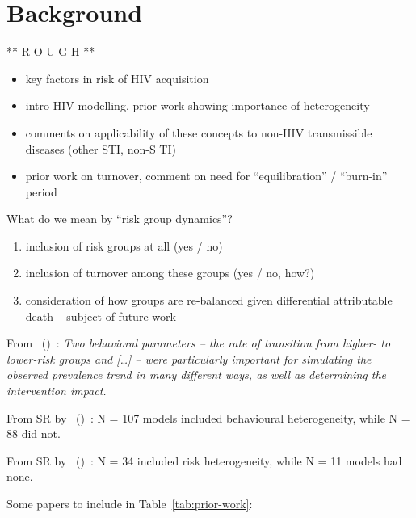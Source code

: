 \documentclass[10pt]{article}
\numberwithin{equation}{section}
\newcommand{\citet}[1]{\citeauthor{#1}~(\citeyear{#1})~\cite{#1}}
\begin{document}
\section{Background}\label{s:background}
** R O U G H **
\begin{itemize}
  \item key factors in risk of HIV acquisition
  \item intro HIV modelling, prior work showing importance of heterogeneity
  \item comments on applicability of these concepts to non-HIV transmissible diseases
        (other STI, non-S TI)
  \item prior work on turnover, comment on need for ``equilibration'' / ``burn-in'' period
\end{itemize}
What do we mean by ``risk group dynamics''?
\begin{enumerate}
  \item inclusion of risk groups at all (yes / no)
  \item inclusion of turnover among these groups (yes / no, how?)
  \item consideration of how groups are re-balanced given differential attributable death
  -- subject of future work
\end{enumerate}
\par
From \citet{Eaton2014}:
\textit{Two behavioral parameters
-- the rate of transition from higher- to lower-risk groups and \textup{[\dots]} -- 
were particularly important for simulating the observed prevalence trend in many different ways,
as well as determining the intervention impact.}
\par
From SR by \citet{Mishra2012}:
N = 107 models included behavioural heterogeneity, while
N = 88 did not.
\par
From SR by \citet{Ronn2017}:
N = 34 included risk heterogeneity, while
N = 11 models had none.
\par
Some papers to include in Table~\ref{tab:prior-work}:
\clearpage
\end{document}
